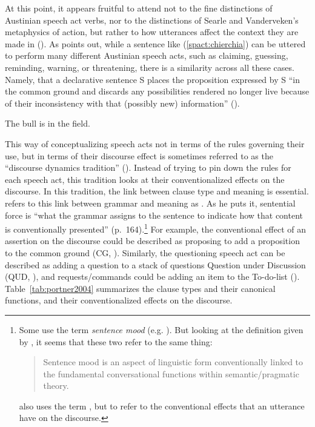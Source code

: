 At this point, it appears fruitful to attend not to the fine distinctions of Austinian speech act verbs, nor to the distinctions of Searle and Vanderveken’s metaphysics of action, but rather to how utterances affect the context they are made in (\cite{hamblin1971, stalnaker1978, lewis1979scorekeeping, gazdar1981speech}). As \textcite{chierchia1990textbook} points out, while a sentence like (\ref{spact:chierchia}) can be uttered to perform many different Austinian speech acts, such as claiming, guessing, reminding, warning, or threatening, there is a similarity across all these cases. Namely, that a declarative sentence S places the proposition expressed by S ``in the common ground and discards any possibilities rendered no longer live because of their inconsistency with that (possibly new) information'' (\cite[p.171]{ chierchia1990textbook}). 

The bull is in the field.
\eex

This way of conceptualizing speech acts not in terms of the rules governing their use, but in terms of their discourse effect is sometimes referred to as the ``discourse dynamics tradition'' (\cite{murraystarr2020}). Instead of trying to pin down the rules for each speech act, this tradition looks at their conventionalized effects on the discourse. 
In this tradition, the link between clause type and meaning is essential. \textcite{chierchia1990textbook} refers to this link between grammar and meaning as . As he puts it, sentential force is ``what the grammar assigns to the sentence to indicate how that content is conventionally presented'' (p.\ 164).\footnote{Some use the term \emph{sentence mood} (e.g. \cite{portner2018}). But looking at the definition given by \textcite{portner2018}, it seems that these two refer to the same thing:
\begin{quote}
Sentence mood is an aspect of linguistic form conventionally linked to the fundamental conversational functions within semantic/pragmatic theory.\\
\hspace*{\fill} \hfill \textcite[p.122]{portner2018}
\end{quote}
\cite{portner2018} also uses the term , but to refer to the conventional effects that an utterance have on the discourse.  
} 
For example, the conventional effect of an assertion on the discourse could be described as proposing to add a proposition to the common ground (CG, \cite{stalnaker1978assertion,stalnaker2002cg}). Similarly, the questioning speech act can be described as adding a question to a stack of questions Question under Discussion (QUD, \cite{roberts1996, ginzburg1995-1}), and requests/commands could be adding an item to the To-do-list (\cite{portner2004}). Table~\ref{tab:portner2004} summarizes the clause types and their canonical functions, and their conventionalized effects on the discourse.

